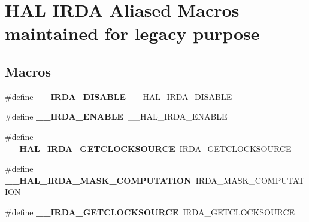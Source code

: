 \hypertarget{group___h_a_l___i_r_d_a___aliased___macros}{\section{H\-A\-L I\-R\-D\-A Aliased Macros maintained for legacy purpose}
\label{group___h_a_l___i_r_d_a___aliased___macros}
}
\subsection*{Macros}
\begin{DoxyCompactItemize}
\item 
\hypertarget{group___h_a_l___i_r_d_a___aliased___macros_gae107b46fa75a7f1f5eb0734cbb24e997}{\#define {\bfseries \-\_\-\-\_\-\-I\-R\-D\-A\-\_\-\-D\-I\-S\-A\-B\-L\-E}~\-\_\-\-\_\-\-H\-A\-L\-\_\-\-I\-R\-D\-A\-\_\-\-D\-I\-S\-A\-B\-L\-E}\label{group___h_a_l___i_r_d_a___aliased___macros_gae107b46fa75a7f1f5eb0734cbb24e997}

\item 
\hypertarget{group___h_a_l___i_r_d_a___aliased___macros_ga30e950fea9b8b878eb721ef488572f93}{\#define {\bfseries \-\_\-\-\_\-\-I\-R\-D\-A\-\_\-\-E\-N\-A\-B\-L\-E}~\-\_\-\-\_\-\-H\-A\-L\-\_\-\-I\-R\-D\-A\-\_\-\-E\-N\-A\-B\-L\-E}\label{group___h_a_l___i_r_d_a___aliased___macros_ga30e950fea9b8b878eb721ef488572f93}

\item 
\hypertarget{group___h_a_l___i_r_d_a___aliased___macros_ga914579d3d8a0ebefab093a54a60bdef4}{\#define {\bfseries \-\_\-\-\_\-\-H\-A\-L\-\_\-\-I\-R\-D\-A\-\_\-\-G\-E\-T\-C\-L\-O\-C\-K\-S\-O\-U\-R\-C\-E}~I\-R\-D\-A\-\_\-\-G\-E\-T\-C\-L\-O\-C\-K\-S\-O\-U\-R\-C\-E}\label{group___h_a_l___i_r_d_a___aliased___macros_ga914579d3d8a0ebefab093a54a60bdef4}

\item 
\hypertarget{group___h_a_l___i_r_d_a___aliased___macros_ga5dfede2931b25ae470e8b9222cd7f276}{\#define {\bfseries \-\_\-\-\_\-\-H\-A\-L\-\_\-\-I\-R\-D\-A\-\_\-\-M\-A\-S\-K\-\_\-\-C\-O\-M\-P\-U\-T\-A\-T\-I\-O\-N}~I\-R\-D\-A\-\_\-\-M\-A\-S\-K\-\_\-\-C\-O\-M\-P\-U\-T\-A\-T\-I\-O\-N}\label{group___h_a_l___i_r_d_a___aliased___macros_ga5dfede2931b25ae470e8b9222cd7f276}

\item 
\hypertarget{group___h_a_l___i_r_d_a___aliased___macros_ga91d8bac965400b5b1e0a9be356a9e477}{\#define {\bfseries \-\_\-\-\_\-\-I\-R\-D\-A\-\_\-\-G\-E\-T\-C\-L\-O\-C\-K\-S\-O\-U\-R\-C\-E}~I\-R\-D\-A\-\_\-\-G\-E\-T\-C\-L\-O\-C\-K\-S\-O\-U\-R\-C\-E}\label{group___h_a_l___i_r_d_a___aliased___macros_ga91d8bac965400b5b1e0a9be356a9e477}


\end{DoxyCompactItemize}
